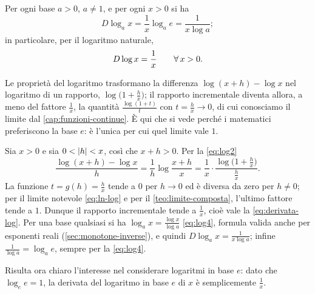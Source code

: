 \begin{proposizione}\label{prop:derivata-log}
Per ogni base $a>0$, $a\neq1$, e per ogni $x>0$ si ha
\begin{equation}\label{eq:derivata-loga}
  D\log_{a}x=\frac1x\log_{a}e=\frac1{x\log a};
\end{equation}
in particolare, per il logaritmo naturale,
\begin{equation}\label{eq:derivata-log}
  D\log x=\frac1x \qquad\forall\, x>0 .
\end{equation}
\end{proposizione}

\begin{schema}
\end{schema}

\begin{strategia}
Le proprietà del logaritmo trasformano la differenza $\log(x+h)-\log x$ nel logaritmo di
un rapporto, $\log\bigl(1+\frac hx\bigr)$; il rapporto incrementale diventa allora,
a meno del fattore $\frac1x$, la quantità $\frac{\log(1+t)}{t}$ con $t=\frac hx\to0$, di cui
conosciamo il limite dal \cref{cap:funzioni-continue}. È qui che si vede perché i
matematici preferiscono la base $e$: è l'unica per cui quel limite vale $1$.
\end{strategia}

\begin{dimostrazione}
Sia $x>0$ e sia $0<\lvert h\rvert<x$, così che $x+h>0$. Per la \eqref{eq:log2}
\begin{equation}\label{eq:rapporto-log}
  \frac{\log(x+h)-\log x}{h}=\frac1h\log\frac{x+h}{x}
  =\frac1x\cdot\frac{\log\bigl(1+\frac hx\bigr)}{\frac hx}.
\end{equation}
La funzione $t=g(h)=\frac hx$ tende a $0$ per $h\to0$ ed è diversa da zero per $h\neq0$;
per il limite notevole \eqref{eq:ln-log} e per il \cref{teo:limite-composta}, l'ultimo
fattore tende a $1$. Dunque il rapporto incrementale tende a $\frac1x$, cioè vale la
\eqref{eq:derivata-log}. Per una base qualsiasi si ha $\log_{a}x=\frac{\log x}{\log a}$
\eqref{eq:log4}, formula valida anche per esponenti reali (\cref{sec:monotone-inverse}),
e quindi $D\log_{a}x=\frac1{x\log a}$; infine $\frac1{\log a}=\log_{a}e$, sempre per la
\eqref{eq:log4}.
\end{dimostrazione}

Risulta ora chiaro l'interesse nel considerare logaritmi in base $e$: dato che
$\log_{e}e=1$, la derivata del logaritmo in base $e$ di $x$ è semplicemente $\frac1x$.

